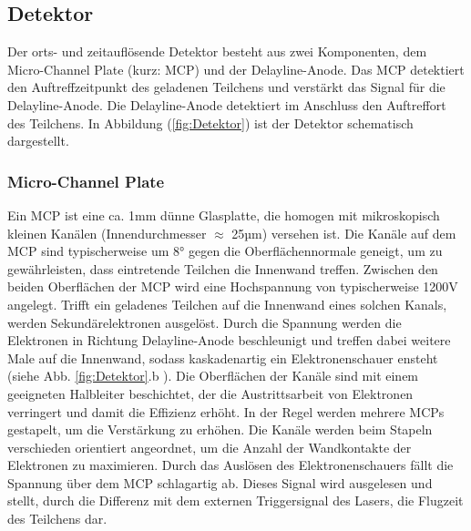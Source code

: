 \subsection{Detektor} \label{sec:Detektor} 

Der orts- und zeitauflösende Detektor besteht aus zwei Komponenten, dem Micro-Channel Plate (kurz: MCP) und der Delayline-Anode. Das MCP detektiert den Auftreffzeitpunkt des geladenen Teilchens und verstärkt das Signal für die Delayline-Anode. Die Delayline-Anode detektiert im Anschluss den Auftreffort des Teilchens. In Abbildung (\ref{fig:Detektor}) ist der Detektor schematisch dargestellt.\\

\subsubsection{Micro-Channel Plate}
 Ein MCP ist eine ca. 1mm dünne Glasplatte, die homogen mit mikroskopisch kleinen Kanälen (Innendurchmesser $\approx$ 25µm) versehen ist. Die Kanäle auf dem MCP sind typischerweise um 8° gegen die Oberflächennormale geneigt, um zu gewährleisten, dass eintretende Teilchen die Innenwand treffen. Zwischen den beiden Oberflächen der MCP wird eine Hochspannung von typischerweise 1200V angelegt.
 Trifft ein geladenes Teilchen auf die Innenwand eines solchen Kanals, werden Sekundärelektronen ausgelöst. Durch die Spannung werden die Elektronen in Richtung Delayline-Anode beschleunigt und treffen dabei weitere Male auf die Innenwand, sodass kaskadenartig ein Elektronenschauer ensteht (siehe Abb. \ref{fig:Detektor}.b ). Die Oberflächen der Kanäle sind mit einem geeigneten Halbleiter beschichtet, der die Austrittsarbeit von Elektronen verringert und damit die Effizienz erhöht. 
 In der Regel werden mehrere MCPs gestapelt, um die Verstärkung zu erhöhen. Die Kanäle werden beim Stapeln verschieden orientiert angeordnet, um die Anzahl der Wandkontakte der Elektronen zu maximieren. %
 Durch das Auslösen des Elektronenschauers fällt die Spannung über dem MCP schlagartig ab. Dieses Signal wird ausgelesen und stellt, durch die Differenz mit dem externen Triggersignal des Lasers, die Flugzeit des Teilchens dar. 
 
